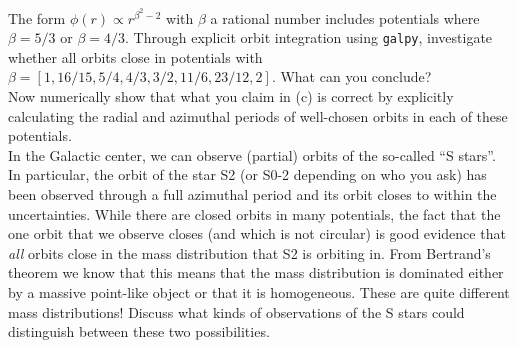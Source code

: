 \documentclass[12pt]{article}
\begin{document}
 The form $\phi(r) \propto r^{\beta^2-2}$ with
$\beta$ a rational number includes potentials where $\beta=5/3$ or
$\beta=4/3$. Through explicit orbit integration using \texttt{galpy},
investigate whether all orbits close in potentials with $\beta =
[1,16/15,5/4,4/3,3/2,11/6,23/12,2]$. What can you conclude?\\

 Now numerically show that what you claim in (c) is
correct by explicitly calculating the radial and azimuthal periods of
well-chosen orbits in each of these potentials.\\

 In the Galactic center, we can observe (partial)
orbits of the so-called ``S stars''. In particular, the orbit of the
star S2 (or S0-2 depending on who you ask) has been observed through a
full azimuthal period and its orbit closes to within the
uncertainties. While there are closed orbits in many potentials, the
fact that the one orbit that we observe closes (and which is not
circular) is good evidence that \emph{all} orbits close in the mass
distribution that S2 is orbiting in. From Bertrand's theorem we know
that this means that the mass distribution is dominated either by a
massive point-like object or that it is homogeneous. These are quite
different mass distributions! Discuss what kinds of observations of
the S stars could distinguish between these two possibilities.\\
\end{document}

